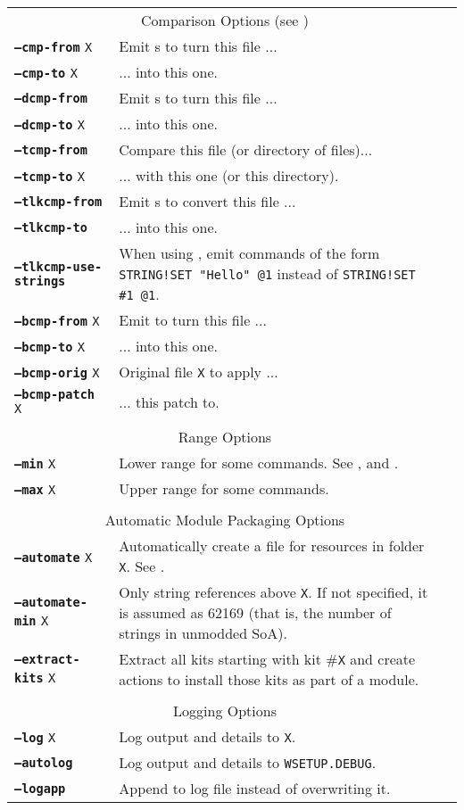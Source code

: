 \documentclass{article}
\def\ttref#1{\ahrefloc{#1}{\tt #1}}
\def\DEFINE#1{{\tt \bf #1}\label{#1}\index{#1}}
\def\t#1{{\tt #1}}
\begin{document}
\begin{tabular}{lp{10in}|p{10in}}
\\
\multicolumn{2}{c}{ {\color{red} Comparison Options} (see \ttref{--out})} \\
\DEFINE{--cmp-from} \t{X}&	Emit \ttref{WRITE!BYTE}s to turn this file ... \\
\DEFINE{--cmp-to}   \t{X}&	... into this one. \\
\DEFINE{--dcmp-from}\t{X}&	Emit \ttref{REPLACE}s to turn this \ttref{DLG} file ... \\
\DEFINE{--dcmp-to}  \t{X}&	... into this one. \\
\DEFINE{--tcmp-from}\t{X}&	Compare this \ttref{TRA} file (or directory of \ttref{TRA }files)... \\
\DEFINE{--tcmp-to}  \t{X}&	... with this one (or this directory). \\
\DEFINE{--tlkcmp-from}\t{X}&	Emit \ttref{STRING!SET}s to convert this \ttref{TLK} file ... \\
\DEFINE{--tlkcmp-to}\t{X}&	... into this one. \\
\DEFINE{--tlkcmp-use-strings} & When using \ttref{--tlkcmp-from}, emit
commands of the form \t{STRING!SET "Hello" @1} instead of \t{STRING!SET \#1
@1}. \\
\DEFINE{--bcmp-from}  \t{X}&      Emit \ttref{APPLY!BCS!PATCH} to turn this
\ttref{BCS} file ... \\
\DEFINE{--bcmp-to}    \t{X}&      ... into this one. \\
\DEFINE{--bcmp-orig}  \t{X}&      Original file \t{X} to apply ... \\
\DEFINE{--bcmp-patch} \t{X}&      ... this patch to. \\
\\
\multicolumn{2}{c}{ \color{red} Range Options} \\
\DEFINE{--min} \t{X} & Lower range for some commands. See
\ttref{--traify-tlk}, \ttref{--tlkcmp-from} and \ttref{--string}.  \\
\DEFINE{--max} \t{X} & Upper range for some commands. \\
\\
\multicolumn{2}{c}{ \color{red} Automatic Module Packaging Options} \\
\DEFINE{--automate} \t{X}&   Automatically create a \ttref{TP2} file for resources in folder \t{X}. See \ttref{--out}. \\
\DEFINE{--automate-min} \t{X}& Only \ttref{--automate} string references above \t{X}. If not specified, it is assumed as 62169 (that is, the number of strings in unmodded SoA). \\
\DEFINE{--extract-kits} \t{X} & Extract all kits starting with kit \#\t{X}
and create \ttref{TP2} actions to install those kits as part of a module.  \\
\\
\multicolumn{2}{c}{ \color{red} Logging Options } \\
\DEFINE{--log} \t{X}&	Log output and details to \t{X}. \\
\DEFINE{--autolog} & 	Log output and details to \t{WSETUP.DEBUG}. \\
\DEFINE{--logapp} & 	Append to log file instead of overwriting it. \\
\end{tabular}
\end{document}
